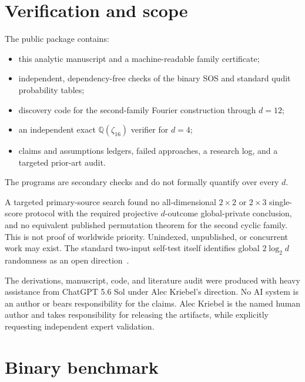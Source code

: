 \documentclass[11pt]{article}
\theoremstyle{remark}
\begin{document}
\section{Verification and scope}

The public package contains:
\begin{itemize}[leftmargin=1.5em]
\item this analytic manuscript and a machine-readable family certificate;
\item independent, dependency-free checks of the binary SOS and standard
  qudit probability tables;
\item discovery code for the second-family Fourier construction through
  \(d=12\);
\item an independent exact \(\mathbb Q(\zeta_{16})\) verifier for \(d=4\);
\item claims and assumptions ledgers, failed approaches, a research log, and
  a targeted prior-art audit.
\end{itemize}
The programs are secondary checks and do not formally quantify over every
\(d\).

A targeted primary-source search found no all-dimensional \(2\times2\) or
\(2\times3\) single-score protocol with the required projective
\(d\)-outcome global-private conclusion, and no equivalent published
permutation theorem for the second cyclic family.  This is not proof of
worldwide priority.  Unindexed, unpublished, or concurrent work may exist.
The standard two-input self-test itself identifies global \(2\log_2d\)
randomness as an open direction~\cite{SarkarEtAl2021}.

The derivations, manuscript, code, and literature audit were produced with
heavy assistance from ChatGPT 5.6 Sol under Alec Kriebel's direction.  No
AI system is an author or bears responsibility for the claims.  Alec Kriebel
is the named human author and takes responsibility for releasing the
artifacts, while explicitly requesting independent expert validation.

\appendix

\section{Binary benchmark}\label{app:binary}
\end{document}
